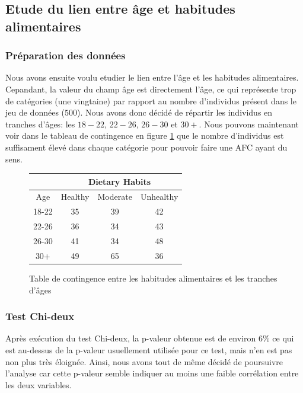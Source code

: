 \subsection{Etude du lien entre âge et habitudes alimentaires}

\subsubsection{Préparation des données}

Nous avons ensuite voulu etudier le lien entre l'âge et les habitudes alimentaires.
Cepandant, la valeur du champ âge est directement l'âge, ce qui représente trop de catégories (une vingtaine) par rapport au nombre d'individus présent dans le jeu de données ($500$).
Nous avons donc décidé de répartir les individus en tranches d'âges: les $18-22$, $22-26$, $26-30$ et $30+$.
Nous pouvons maintenant voir dans le tableau de contingence en figure \ref{tab:contTableAgeDietary} que le nombre d'individus est suffisament élevé dans chaque catégorie pour pouvoir faire une AFC ayant du sens.

\begin{figure}[!h]
\begin{center}
  \begin{tabular}{|c|c|c|c|}
    \hline 
    & \multicolumn{3}{|c|}{Dietary Habits}\\ 
    \hline
    Age & Healthy & Moderate & Unhealthy \\ 
    \hline 
    18-22 & 35 & 39 & 42 \\ 
    \hline 
    22-26 & 36 & 34 & 43 \\ 
    \hline 
    26-30 & 41 & 34 & 48 \\ 
    \hline 
    30+ & 49 & 65 & 36 \\ 
    \hline
  \end{tabular}
\end{center}
\caption{Table de contingence entre les habitudes alimentaires et les tranches d'âges}
\label{tab:contTableAgeDietary}
\end{figure}

\subsubsection{Test Chi-deux}

Après exécution du test Chi-deux, la p-valeur obtenue est de environ $6\%$ ce qui est au-dessus de la p-valeur usuellement utilisée pour ce test, mais n'en est pas non plus très éloignée.
Ainsi, nous avons tout de même décidé de poursuivre l'analyse car cette p-valeur semble indiquer au moins une faible corrélation entre les deux variables.

